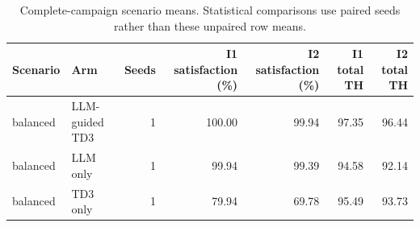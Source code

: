 \begin{table}[t]
\centering
\caption{Complete-campaign scenario means. Statistical comparisons use paired seeds rather than these unpaired row means.}
\label{tab:campaign-performance}
\begin{tabular}{llrrrrr}
\toprule
Scenario & Arm & Seeds & I1 satisfaction (\%) & I2 satisfaction (\%) & I1 total TH & I2 total TH\\
\midrule
balanced & LLM-guided TD3 & 1 & 100.00 & 99.94 & 97.35 & 96.44 \\
balanced & LLM only & 1 & 99.94 & 99.39 & 94.58 & 92.14 \\
balanced & TD3 only & 1 & 79.94 & 69.78 & 95.49 & 93.73 \\
\bottomrule
\end{tabular}
\end{table}
